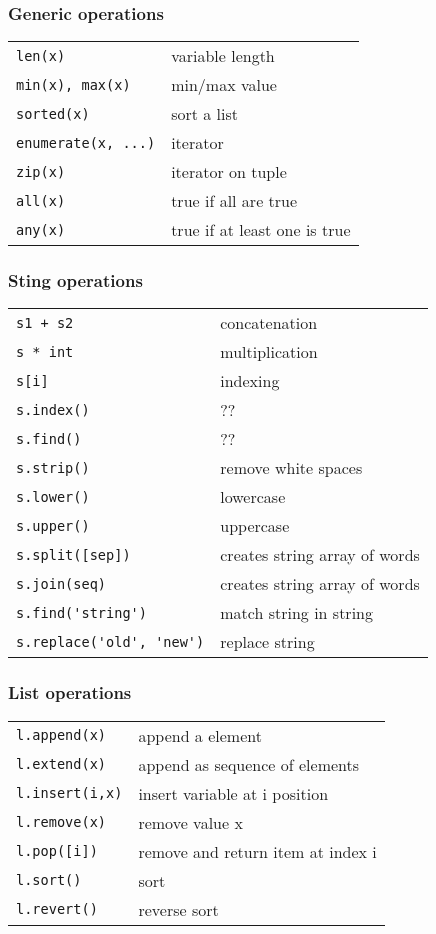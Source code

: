 \subsubsection{Generic operations}
\begin{tabular}{@{}ll@{}}
    \verb!len(x)!    & variable length \\
    \verb!min(x), max(x)!    & min/max value \\
    \verb!sorted(x)!    & sort a list \\
    \verb!enumerate(x, ...)!    & iterator \\
    \verb!zip(x)!    & iterator on tuple \\
    \verb!all(x)!    & true if all are true \\
    \verb!any(x)!    & true if at least one is true \\
\end{tabular}


\subsubsection{Sting operations}
\begin{tabular}{@{}ll@{}}
    \verb!s1 + s2!    & concatenation \\
    \verb!s * int!    & multiplication \\
    \verb!s[i]!    & indexing \\
    \verb!s.index()!    & ?? \\
    \verb!s.find()!    & ?? \\
    \verb!s.strip()!    & remove white spaces \\
    \verb!s.lower()!    & lowercase \\
    \verb!s.upper()!    & uppercase \\
    \verb!s.split([sep])!    & creates string array of words \\
    \verb!s.join(seq)!    & creates string array of words \\
    \verb!s.find('string')!    & match string in string \\
    \verb!s.replace('old', 'new')!    & replace string \\
\end{tabular}


\subsubsection{List operations}
\begin{tabular}{@{}ll@{}}
    \verb!l.append(x)!    & append a element \\
    \verb!l.extend(x)!    & append as sequence of elements \\
    \verb!l.insert(i,x)!    & insert variable at i position \\
    \verb!l.remove(x)!    & remove value x \\
    \verb!l.pop([i])!    & remove and return item at index i \\
    \verb!l.sort()!    & sort \\
    \verb!l.revert()!    & reverse sort \\
\end{tabular}


